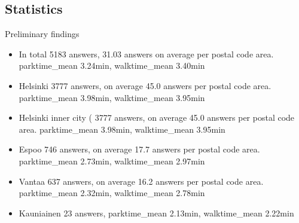 \subsection{Statistics}
\justify

Preliminary findings
\begin{itemize}
    \item In total 5183 answers, 31.03 answers on average per postal code area. parktime\_mean 3.24min, walktime\_mean 3.40min
    \item Helsinki 3777 answers, on average 45.0 answers per postal code area. parktime\_mean 3.98min, walktime\_mean 3.95min
    \item Helsinki inner city ( 3777 answers, on average 45.0 answers per postal code area. parktime\_mean 3.98min, walktime\_mean 3.95min
    \item Espoo 746 answers, on average 17.7 answers per postal code area. parktime\_mean 2.73min, walktime\_mean 2.97min
    \item Vantaa 637 answers, on average 16.2 answers per postal code area. parktime\_mean 2.32min, walktime\_mean 2.78min
    \item Kauniainen 23 answers, parktime\_mean 2.13min, walktime\_mean 2.22min
\end{itemize}